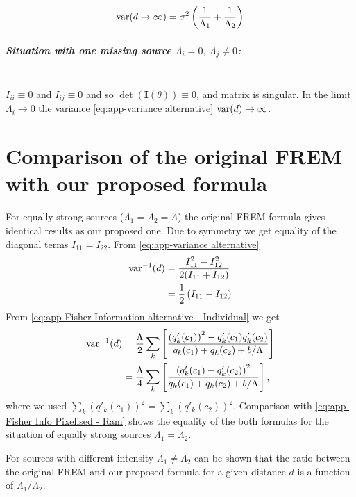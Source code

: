 \begin{equation*}
	\mathrm{var}(d\rightarrow\infty) =\sigma^2\left(\frac{1}{\Lambda_1}+\frac{1}{\Lambda_2}\right)
\end{equation*}

\subparagraph*{Situation with one missing source $\Lambda_i=0,\ \Lambda_j\neq0$:}\ \\
$I_{ii}\equiv0$ and $I_{ij}\equiv0$ and so $\det(\bm{I}(\theta))\equiv0$, and matrix is singular. In the limit $\Lambda_i\rightarrow0$ the
variance \autoref{eq:app-variance alternative} $\mathrm{var}(d)\rightarrow\infty$. 


\section{Comparison of the original FREM with our proposed formula}
For equally strong sources ($\Lambda_1= \Lambda_2=\Lambda$) the original FREM formula gives identical results as our proposed one. Due to symmetry we get equality of the diagonal terms $I_{11}=I_{22}$. From \autoref{eq:app-variance alternative}
\begin{alignat}{2}
	\mathrm{var}^{-1}(d)
	&=\frac{I_{11}^2-I_{12}^2}{2(I_{11}+I_{12})}\nonumber\\
	&=\frac{1}{2}\left(I_{11}-I_{12}\right)
\end{alignat}
%
From  \autoref{eq:app-Fisher Information alternative - Individual} we get
\begin{alignat}{2}
	\mathrm{var}^{-1}(d)
	&=\frac{\Lambda}{2}\sum_k\left[\frac{\left(q'_k(c_1)\right)^2-q'_k(c_1)q'_k(c_2)}{q_k(c_1)+q_k(c_2)+b/\Lambda} \right]\nonumber\\
	&=\frac{\Lambda}{4}\sum_k\left[\frac{\left(q'_k(c_1)-q'_k(c_2)\right)^2}{q_k(c_1)+q_k(c_2)+b/\Lambda} \right],
\end{alignat}
% 
where we used $\sum_k\left(q'_k(c_1)\right)^2=\sum_k\left(q'_k(c_2)\right)^2$. Comparison with \autoref{eq:app-Fisher Info Pixelised - Ram} shows the equality of the both formulas for the situation of equally strong sources $\Lambda_1=\Lambda_2$.

For sources with different intensity $\Lambda_1\neq\Lambda_2$ can be shown that the ratio between the original FREM and our proposed formula for a given distance $d$ is a function of $\Lambda_1/\Lambda_2$. 


